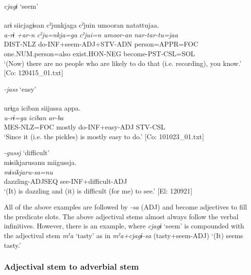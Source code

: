 \ex  \textit{cjagɨ} ‘seem’\\\\
     \glll arɨ  siicjagɨsan  cˀjunkjaga    cˀjuin  umooran  natattujaa.\\
      \textit{a-rɨ}  \textit{+ar-n}  \textit{cˀju=nkja=ga}   \textit{cˀjui=n}  \textit{umoor-an}  \textit{nar-tar-tu=jaa}\\                                                                          
      DIST-NLZ  do-INF+seem-ADJ+STV-ADN  person=APPR=FOC                   one.NUM.person=also  exist.HON-NEG  become-PST-CSL=SOL\\
     \glt  ‘(Now) there are no people who are likely to do that (i.e. recording), you know.’   [Co: 120415\_01.txt]

\ex \textit{{}-jass} ‘easy’\\\\
    \glll     urɨga  {\textbar}iciban{\textbar}  siijassa  appa.\\
      \textit{u-rɨ=ga}  \textit{iciban}  \textit{}  \textit{ar-ba}\\
      MES-NLZ=FOC  mostly  do-INF+easy-ADJ  STV-CSL\\
      \glt       ‘Since it (i.e. the pickles) is mostly easy to do.’ [Co: 101023\_01.txt]

\ex \textit{{}-gussj} ‘difficult’\\
\glll      mɨsikjarusanu  miigussja.\\
      \textit{mɨsikjaru-sa=nu}  \textit{}\\
      dazzling-ADJSEQ  see-INF+difficult-ADJ\\
      \glt       ‘(It) is dazzling and (it) is difficult (for me) to see.’ [El: 120921]
     \z
\z

All of the above examples are followed by \textit{{}-sa} (ADJ) and become adjectives to fill the predicate slots. The above adjectival stems almost always follow the verbal infinitives. However, there is an example, where \textit{cjagɨ} ‘seem’ is compounded with the adjectival stem \textit{mˀa} ‘tasty’ as in \textit{mˀa+cjagɨ-sa} (tasty+seem-ADJ) ‘(It) seems tasty.’

\subsubsection{Adjectival stem to adverbial stem}\label{sec:4.3.8.3}


